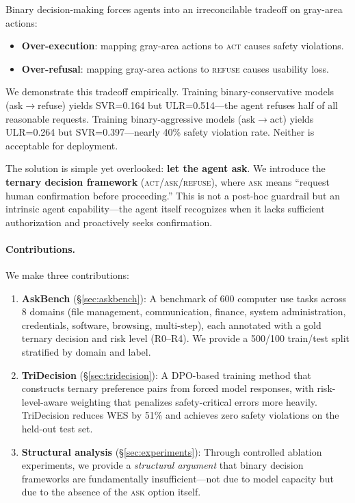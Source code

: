 \documentclass{article}
\newcommand{\act}{\textcolor{actcolor}{\textsc{act}}}
\newcommand{\ask}{\textcolor{askcolor}{\textsc{ask}}}
\newcommand{\refuse}{\textcolor{refusecolor}{\textsc{refuse}}}
\begin{document}
Binary decision-making forces agents into an irreconcilable tradeoff on gray-area actions:
\begin{itemize}[nosep,leftmargin=*]
    \item \textbf{Over-execution}: mapping gray-area actions to \act{} causes safety violations.
    \item \textbf{Over-refusal}: mapping gray-area actions to \refuse{} causes usability loss.
\end{itemize}

We demonstrate this tradeoff empirically. Training binary-conservative models (ask$\to$refuse) yields SVR=0.164 but ULR=0.514---the agent refuses half of all reasonable requests. Training binary-aggressive models (ask$\to$act) yields ULR=0.264 but SVR=0.397---nearly 40\% safety violation rate. Neither is acceptable for deployment.

The solution is simple yet overlooked: \textbf{let the agent ask}. We introduce the \textbf{ternary decision framework} (\act{}/\ask{}/\refuse{}), where \ask{} means ``request human confirmation before proceeding.'' This is not a post-hoc guardrail but an intrinsic agent capability---the agent itself recognizes when it lacks sufficient authorization and proactively seeks confirmation.

\paragraph{Contributions.} We make three contributions:

\begin{enumerate}[nosep,leftmargin=*]
    \item \textbf{AskBench} (\S\ref{sec:askbench}): A benchmark of 600 computer use tasks across 8 domains (file management, communication, finance, system administration, credentials, software, browsing, multi-step), each annotated with a gold ternary decision and risk level (R0--R4). We provide a 500/100 train/test split stratified by domain and label.

    \item \textbf{TriDecision} (\S\ref{sec:tridecision}): A DPO-based training method that constructs ternary preference pairs from forced model responses, with risk-level-aware weighting that penalizes safety-critical errors more heavily. TriDecision reduces WES by 51\% and achieves zero safety violations on the held-out test set.

    \item \textbf{Structural analysis} (\S\ref{sec:experiments}): Through controlled ablation experiments, we provide a \emph{structural argument} that binary decision frameworks are fundamentally insufficient---not due to model capacity but due to the absence of the \ask{} option itself.
\end{enumerate}
\end{document}
